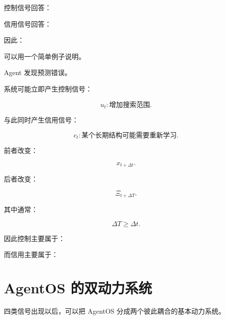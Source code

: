 控制信号回答：

\begin{statementbox}
\centering
{}
\end{statementbox}

信用信号回答：

\begin{statementbox}
\centering
{}
\end{statementbox}

因此：

\begin{statementbox}
\centering
{}
\end{statementbox}

可以用一个简单例子说明。

Agent 发现预测错误。

系统可能立即产生控制信号：

\[
u_t:
\text{增加搜索范围}.
\]

与此同时产生信用信号：

\[
c_t:
\text{某个长期结构可能需要重新学习}.
\]

前者改变：

\[
x_{t+\Delta t}.
\]

后者改变：

\[
\Xi_{t+\Delta T}.
\]

其中通常：

\[
\Delta T
\ge
\Delta t.
\]

因此控制主要属于：

\begin{statementbox}
\centering
{}
\end{statementbox}

而信用主要属于：

\begin{statementbox}
\centering
{}
\end{statementbox}

\section{AgentOS 的双动力系统}

四类信号出现以后，可以把 AgentOS 分成两个彼此耦合的基本动力系统。


